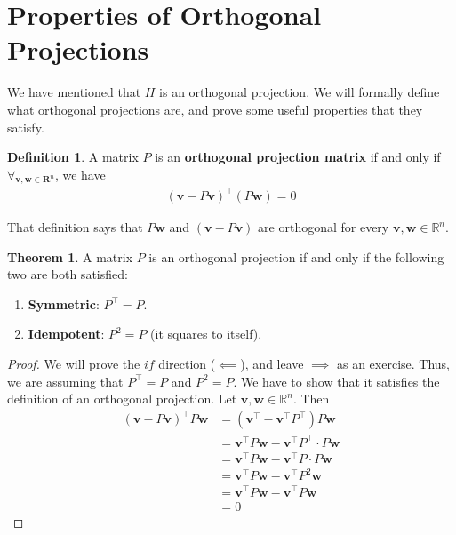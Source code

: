 \documentclass[12pt, a4paper]{article}
\theoremstyle{definition}
\newtheorem*{definition}{Definition}
\newtheorem{theorem}{Theorem}
\begin{document}
	\section*{Properties of Orthogonal Projections}
	We have mentioned that $H$ is an orthogonal projection. We will formally define what
	orthogonal projections are, and prove some useful properties that they satisfy.
	\begin{tcolorbox}[breakable]
		\begin{definition}
			A matrix $P$ is an \textbf{orthogonal projection matrix} if and only if
			$\forall_{\mathbf{v}, \mathbf{w}\in\mathbf{R}^n}$, we have
			\begin{align*}
				(\mathbf{v}-P\mathbf{v})^\top (P\mathbf{w})=0
			\end{align*}
		\end{definition}
	\end{tcolorbox}
	That definition says that $P\mathbf{w}$ and $(\mathbf{v}-P\mathbf{v})$ are orthogonal
	for every $\mathbf{v},\mathbf{w}\in\mathbb{R}^n$.
	\begin{tcolorbox}[breakable]
		\begin{theorem}
			\label{thm:orthogonal-proj-matrix}
			A matrix $P$ is an orthogonal projection if and only if the following two
			are both satisfied:
			\begin{enumerate}[label=(\roman*)]
				\item \textbf{Symmetric}: $P^\top=P$.
				\item \textbf{Idempotent}: $P^2=P$ (it squares to itself).
			\end{enumerate}
		\end{theorem}
		\begin{proof}
			We will prove the $if$ direction ($\impliedby$), and leave $\implies$ as an exercise.
			Thus, we are assuming that $P^\top=P$ and $P^2=P$. We have to show that it satisfies
			the definition of an orthogonal projection. Let $\mathbf{v},\mathbf{w}\in \mathbb{R}^n$. Then
			\begin{align*}
				(\mathbf{v}-P\mathbf{v})^\top P\mathbf{w}
				&= (\mathbf{v}^\top - \mathbf{v}^\top P^\top)P\mathbf{w}\\
				&=\mathbf{v}^\top P\mathbf{w}-\mathbf{v}^\top P^\top\cdot P\mathbf{w}\\
				&=\mathbf{v}^\top P\mathbf{w}-\mathbf{v}^\top P \cdot P\mathbf{w}
				\tag{Symmetry: $P^\top=P$}\\
				&=\mathbf{v}^\top P\mathbf{w}-\mathbf{v}^\top P^2\mathbf{w}\\
				&=\mathbf{v^\top}P\mathbf{w}-\mathbf{v}^\top P\mathbf{w}
				\tag{Idempotency: $P^2=P$}\\
				&=0
			\end{align*}
		\end{proof}
	\end{tcolorbox}
\end{document}

